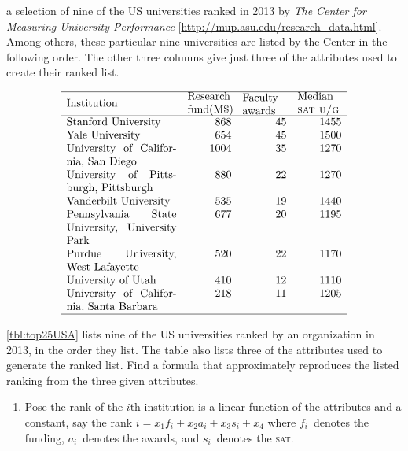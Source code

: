 \begin{exercise} \label{ex:top25USA} 
\begin{table}
\caption{a selection of nine of the US universities ranked in 2013 by \emph{The Center for Measuring University Performance} [\url{http://mup.asu.edu/research_data.html}].  
Among others, these particular nine universities are listed by the Center in the following order.  
The other three columns give just three of the attributes used to create their ranked list.}
\label{tbl:top25USA}
\begin{equation*}
\begin{array}{p{10em}rrr}
\hline
Institution& 
\parbox{4em}{\raggedright Research fund(M\$)}& 
\parbox{4em}{\raggedright Faculty awards} & 
\parbox{4em}{\raggedright Median \textsc{sat u/g}}\\
\hline
Stanford University&868&45&1455\\
Yale University&654&45&1500\\
University of California, San Diego&1004&35&1270\\
University of Pittsburgh, Pittsburgh&880&22&1270\\
Vanderbilt University&535&19&1440\\
Pennsylvania State University, University Park&677&20&1195\\
Purdue University, West Lafayette&520&22&1170\\
University of Utah&410&12&1110\\
University of California, Santa Barbara&218&11&1205\\
\hline
\end{array}
\end{equation*}
\end{table}%
\cref{tbl:top25USA} lists nine of the US universities ranked by an organization in 2013, in the order they list.
The table also lists three of the attributes used to generate the ranked list.
Find a formula that approximately reproduces the listed ranking from the three given attributes.
\begin{enumerate}
\item Pose the rank of the \(i\)th institution is a linear function of the attributes and a constant, say the rank \(i=x_1f_i+x_2a_i+x_3s_i+x_4\) where \(f_i\)~denotes the funding, \(a_i\)~denotes the awards, and \(s_i\)~denotes the \textsc{sat}.

\end{enumerate}
\end{exercise}
